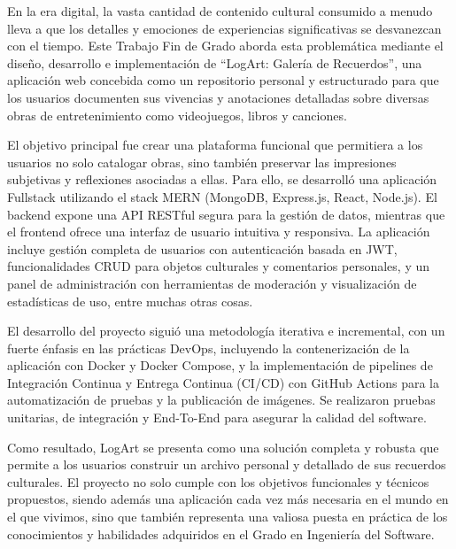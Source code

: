 \documentclass[11pt,twoside,titlepage]{report}
\begin{document}
En la era digital, la vasta cantidad de contenido cultural consumido a menudo lleva a que los detalles y emociones de experiencias significativas se desvanezcan con el tiempo. Este Trabajo Fin de Grado aborda esta problemática mediante el diseño, desarrollo e implementación de ``LogArt: Galería de Recuerdos'', una aplicación web concebida como un repositorio personal y estructurado para que los usuarios documenten sus vivencias y anotaciones detalladas sobre diversas obras de entretenimiento como videojuegos, libros y canciones.

El objetivo principal fue crear una plataforma funcional que permitiera a los usuarios no solo catalogar obras, sino también preservar las impresiones subjetivas y reflexiones asociadas a ellas. Para ello, se desarrolló una aplicación Fullstack utilizando el stack MERN (MongoDB, Express.js, React, Node.js). El backend expone una API RESTful segura para la gestión de datos, mientras que el frontend ofrece una interfaz de usuario intuitiva y responsiva. La aplicación incluye gestión completa de usuarios con autenticación basada en JWT, funcionalidades CRUD para objetos culturales y comentarios personales, y un panel de administración con herramientas de moderación y visualización de estadísticas de uso, entre muchas otras cosas.

El desarrollo del proyecto siguió una metodología iterativa e incremental, con un fuerte énfasis en las prácticas DevOps, incluyendo la contenerización de la aplicación con Docker y Docker Compose, y la implementación de pipelines de Integración Continua y Entrega Continua (CI/CD) con GitHub Actions para la automatización de pruebas y la publicación de imágenes. Se realizaron pruebas unitarias, de integración y End-To-End para asegurar la calidad del software.

Como resultado, LogArt se presenta como una solución completa y robusta que permite a los usuarios construir un archivo personal y detallado de sus recuerdos culturales. El proyecto no solo cumple con los objetivos funcionales y técnicos propuestos, siendo además una aplicación cada vez más necesaria en el mundo en el que vivimos, sino que también representa una valiosa puesta en práctica de los conocimientos y habilidades adquiridos en el Grado en Ingeniería del Software.

\mbox{} \bigskip
\end{document}
